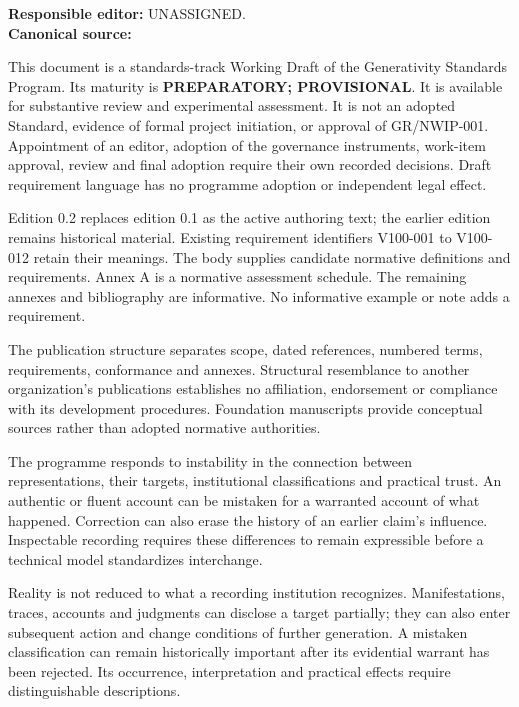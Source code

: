 \documentclass[11pt,a4paper]{article}
\begin{document}
\GSPfrontmatter
{}
\noindent\textbf{Responsible editor:} UNASSIGNED.\\
\textbf{Canonical source:} 

This document is a standards-track Working Draft of the Generativity Standards Program. Its maturity is \textbf{PREPARATORY; PROVISIONAL}. It is available for substantive review and experimental assessment. It is not an adopted Standard, evidence of formal project initiation, or approval of GR/NWIP-001. Appointment of an editor, adoption of the governance instruments, work-item approval, review and final adoption require their own recorded decisions. Draft requirement language has no programme adoption or independent legal effect.

Edition 0.2 replaces edition 0.1 as the active authoring text; the earlier edition remains historical material. Existing requirement identifiers V100-001 to V100-012 retain their meanings. The body supplies candidate normative definitions and requirements. Annex A is a normative assessment schedule. The remaining annexes and bibliography are informative. No informative example or note adds a requirement.

The publication structure separates scope, dated references, numbered terms, requirements, conformance and annexes. Structural resemblance to another organization's publications establishes no affiliation, endorsement or compliance with its development procedures. Foundation manuscripts provide conceptual sources rather than adopted normative authorities.

\tableofcontents\clearpage
{}
The programme responds to instability in the connection between representations, their targets, institutional classifications and practical trust. An authentic or fluent account can be mistaken for a warranted account of what happened. Correction can also erase the history of an earlier claim's influence. Inspectable recording requires these differences to remain expressible before a technical model standardizes interchange.

Reality is not reduced to what a recording institution recognizes. Manifestations, traces, accounts and judgments can disclose a target partially; they can also enter subsequent action and change conditions of further generation. A mistaken classification can remain historically important after its evidential warrant has been rejected. Its occurrence, interpretation and practical effects require distinguishable descriptions.
\end{document}
